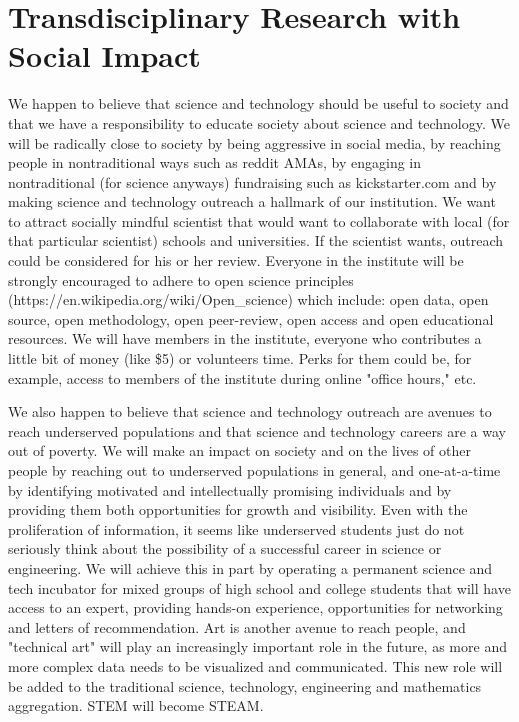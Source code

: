 \section{Transdisciplinary Research with Social Impact}

We happen to believe that science and technology should be useful to society and that we have a responsibility to educate society about science and technology. We will be radically close to society by being aggressive in social media, by reaching people in nontraditional ways such as reddit AMAs, by engaging in nontraditional (for science anyways) fundraising such as kickstarter.com and by making science and technology outreach a hallmark of our institution. We want to attract socially mindful scientist that would want to collaborate with local (for that particular scientist) schools and universities. If the scientist wants, outreach could be considered for his or her review. Everyone in the institute will be strongly encouraged to adhere to open science principles (https://en.wikipedia.org/wiki/Open_science) which include: open data, open source, open methodology, open peer-review, open access and open educational resources. We will have members in the institute, everyone who contributes a little bit of money (like \$5) or volunteers time. Perks for them could be, for example, access to members of the institute during online "office hours," etc. 

We also happen to believe that science and technology outreach are avenues to reach underserved populations and that science and technology careers are a way out of poverty. We will make an impact on society and on the lives of other people by reaching out to underserved populations in general, and one-at-a-time by identifying motivated and intellectually promising individuals and by providing them both opportunities for growth and visibility. Even with the proliferation of information, it seems like underserved students just do not seriously think about the possibility of a successful career in science or engineering. We will achieve this in part by operating a permanent science and tech incubator for mixed groups of high school and college students that will have access to an expert, providing hands-on experience, opportunities for networking and letters of recommendation. Art is another avenue to reach people, and "technical art" will play an increasingly important role in the future, as more and more complex data needs to be visualized and communicated. This new role will be added to the traditional science, technology, engineering and mathematics aggregation. STEM will become STEAM.

